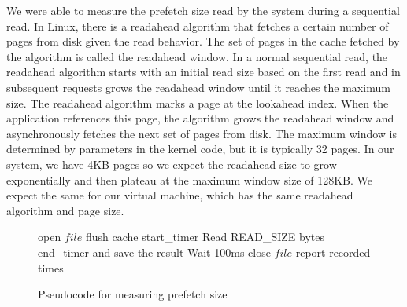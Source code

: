 We were able to measure the prefetch size read by the system during a sequential 
read. In Linux, there is a readahead algorithm that fetches a certain number of 
pages from disk given the read behavior. The set of pages in the cache fetched by 
the algorithm is called the readahead window. In a normal sequential read, the 
readahead algorithm starts with an initial read size based on the first read and in
subsequent requests grows the readahead window until it reaches the maximum size. 
The readahead algorithm marks a page at the lookahead index. When the application 
references this page, the algorithm grows the readahead window and asynchronously 
fetches the next set of pages from disk. The maximum window is determined by 
parameters in the kernel code, but it is typically 32 pages. In our system, we have
4KB pages so we expect the readahead size to grow exponentially and then plateau at
the maximum window size of 128KB. We expect the same for our virtual machine, which 
has the same readahead algorithm and page size.

\begin{figure}[t!]
	\begin{algorithmic}
		\STATE open $file$
		\STATE flush cache
		\STATE start\_timer
		\STATE Read READ\_SIZE bytes
		\STATE end\_timer and save the result
		\STATE Wait 100ms
		\ENDFOR
		\STATE close $file$
		\STATE report recorded times
	\end{algorithmic}
	\caption{Pseudocode for measuring prefetch size}
	\label{fig:p2_code}
\end{figure}

